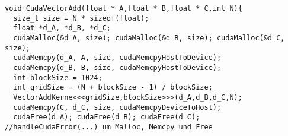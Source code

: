 \begin{lstlisting}
void CudaVectorAdd(float * A,float * B,float * C,int N){
  size_t size = N * sizeof(float);
  float *d_A, *d_B, *d_C;
  cudaMalloc(&d_A, size); cudaMalloc(&d_B, size); cudaMalloc(&d_C, size);
  cudaMemcpy(d_A, A, size, cudaMemcpyHostToDevice);
  cudaMemcpy(d_B, B, size, cudaMemcpyHostToDevice);
  int blockSize = 1024;
  int gridSize = (N + blockSize - 1) / blockSize;
  VectorAddKerne<<<gridSize,blockSize>>>(d_A,d_B,d_C,N);
  cudaMemcpy(C, d_C, size, cudaMemcpyDeviceToHost);
  cudaFree(d_A); cudaFree(d_B); cudaFree(d_C);
//handleCudaError(...) um Malloc, Memcpy und Free
\end{lstlisting}